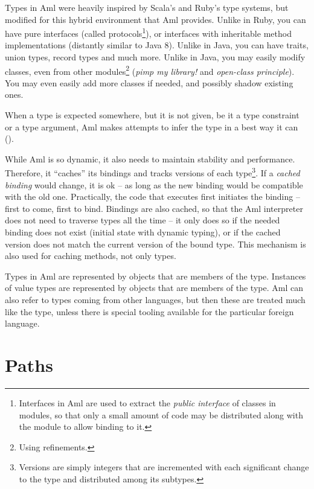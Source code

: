 Types in Aml were heavily inspired by Scala's and Ruby's type systems, but modified for this hybrid environment that Aml provides. Unlike in Ruby, you can have pure interfaces (called protocols\footnote{Interfaces in Aml are used to extract the {\em public interface} of classes in modules, so that only a small amount of code may be distributed along with the module to allow binding to it.}), or interfaces with inheritable method implementations (distantly similar to Java 8). Unlike in Java, you can have traits, union types, record types and much more. Unlike in Java, you may easily modify classes, even from other modules\footnote{Using refinements.} ({\em pimp my library!} and {\em open-class principle}). You may even easily add more classes if needed, and possibly shadow existing ones. 

When a type is expected somewhere, but it is not given, be it a type constraint or a type argument, Aml makes attempts to infer the type in a best way it can (). 

While Aml is so dynamic, it also needs to maintain stability and performance. Therefore, it ``caches'' its bindings and tracks versions of each type\footnote{Versions are simply integers that are incremented with each significant change to the type and distributed among its subtypes.}. If a {\em cached binding} would change, it is ok -- as long as the new binding would be compatible with the old one. Practically, the code that executes first initiates the binding -- first to come, first to bind. Bindings are also cached, so that the Aml interpreter does not need to traverse types all the time -- it only does so if the needed binding does not exist (initial state with dynamic typing), or if the cached version does not match the current version of the bound type. This mechanism is also used for caching methods, not only types.

Types in Aml are represented by objects that are members of the  type. Instances of value types are represented by objects that are members of the  type. Aml can also refer to types coming from other languages, but then these are treated much like the  type, unless there is special tooling available for the particular foreign language. 






\section{Paths}
\label{sec:type-paths}

